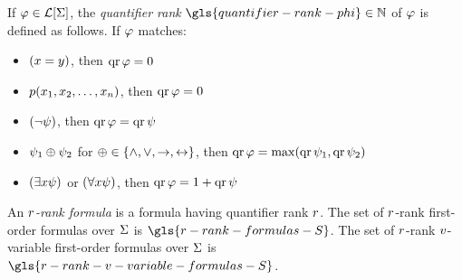 
If $\varphi \in \mathcal{L}[\mathrm{\Sigma}]$, the \emph{quantifier rank}
$\gls{quantifier-rank-phi} \in \Nats$ of $\varphi$ is defined as follows. If
$\varphi$ matches:
\begin{itemize}
  \item $(x = y)$, then $\operatorname{qr}\varphi = 0$
  \item $p(x_{1}, x_{2}, \dots, x_{n})$, then $\operatorname{qr}\varphi = 0$
  \item $(\lnot\psi)$, then $\operatorname{qr}\varphi = \operatorname{qr}\psi$
  \item $\psi_1 \oplus \psi_2$
  for $\oplus \in \left\{\land,\lor,\rightarrow,\leftrightarrow\right\}$,
  then $\operatorname{qr}\varphi = \max(\operatorname{qr}{\psi_1},\operatorname{qr}{\psi_2})$
  \item $(\exists x \psi)$ or $(\forall x \psi)$,
  then $\operatorname{qr}\varphi = 1 +\operatorname{qr}\psi$
\end{itemize}
An \emph{$r$-rank formula} is a formula having quantifier rank $r$.
The set of $r$-rank first-order formulas over $\mathrm{\Sigma}$ is
$\gls{r-rank-formulas-S}$.
The set of $r$-rank $v$-variable first-order formulas over $\mathrm{\Sigma}$ is
$\gls{r-rank-v-variable-formulas-S}$.